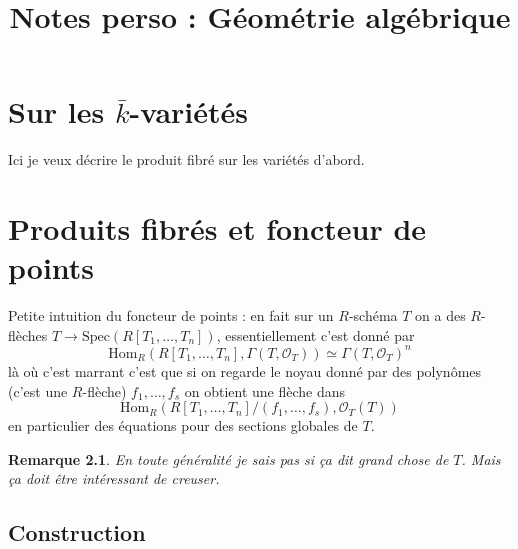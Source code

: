 \documentclass[a4paper,12pt]{book}
\title{Notes perso : Géométrie algébrique}
\date{}
\newcommand{\Or}{\mathcal{O}}
\newcommand{\Hom}{\textrm{Hom}}
\newcommand{\Spec}{\textrm{Spec}}
\theoremstyle{plain}
\newtheorem{rem}{Remarque}
\theoremstyle{definition}
\theoremstyle{remark}
\begin{document}
\maketitle
\tableofcontents

\chapter{Sur les $\bar k$-variétés}
Ici je veux décrire le produit fibré sur les variétés d'abord.

\chapter{Produits fibrés et foncteur de points}
Petite intuition du foncteur de points : en fait sur un $R$-schéma $T$
on a des $R$-flèches $T\to \Spec(R[T_1,\ldots,T_n])$, essentiellement 
c'est donné par 
\[\Hom_R(R[T_1,\ldots,T_n],\Gamma(T,\Or_T))\simeq \Gamma(T,\Or_T)^n\]
là où c'est marrant c'est que si on regarde le noyau donné par des 
polynômes (c'est une $R$-flèche) $f_1,\ldots, f_s$ on obtient une 
flèche dans 
\[\Hom_R(R[T_1,\ldots, T_n]/(f_1,\ldots, f_s), \Or_T(T))\]
en particulier des équations pour des sections globales de $T$.

\begin{rem}
    En toute généralité je sais pas si ça dit grand chose de $T$. Mais
    ça doit être intéressant de creuser.
\end{rem}


\section{Construction}





\printbibliography
\end{document}

